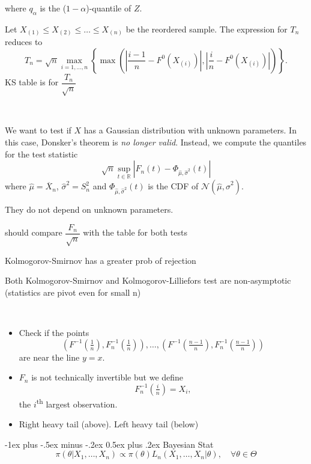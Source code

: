 \documentclass[a4paper, 10pt,landscape]{article}
\makeatletter
\renewcommand{\section}{\@startsection{section}{1}{0mm}%
                                {-1ex plus -.5ex minus -.2ex}%
                                {0.5ex plus .2ex}%
                                {\normalfont\large\bfseries}}
\makeatother
\begin{document}
\begin{multicols*}{4}
\begin{description}
\begin{description}
				where $q_\alpha$ is the ($1-\alpha$)-quantile of $Z$.
				\item Let $X_{(1)}\leq X_{(2)}\leq\dots\leq X_{(n)}$ be the reordered sample. The expression for $T_n$ reduces to
				$$T_n=\sqrt{n}\max\limits_{i=1,\dots,n}\left\{\max\left(\left|\dfrac{i-1}{n}-F^0\left(X_{(i)}\right)\right|,\left|\dfrac{i}{n}-F^0\left(X_{(i)}\right)\right|\right)\right\}.$$
				KS table is for $\dfrac{T_n}{\sqrt{n}}$
			\end{description}	
		\item[Kolmogorov-Lilliefors Test]~
			\begin{description}		
				\item We want to test if $X$ has a Gaussian distribution with unknown parameters. In this case, Donsker's theorem is {\it no longer valid}. Instead, we compute the quantiles for the test statistic
				$$\sqrt{n}\sup\limits_{t\in\mathbb{R}}\left|F_n(t)-\Phi_{\hat{\mu},\hat{\sigma}^2}(t)\right|$$
				where $\hat{\mu}=\overline{X}_n$, $\hat{\sigma}^2=S_n^2$ and $\Phi_{\hat{\mu},\hat{\sigma}^2}(t)$ is the CDF of $\mathcal{N}\left(\hat{\mu},\hat{\sigma}^2\right).$
				\item They do not depend on unknown parameters.
				\item should compare $\dfrac{F_n}{\sqrt{n}}$ with the table for both tests
				\item Kolmogorov-Smirnov has a greater prob of rejection
				\item Both Kolmogorov-Smirnov and Kolmogorov-Lilliefors test are non-asymptotic (statistics are pivot even for small n)
			\end{description}
		\item[QQ plot]~
			\begin{itemize}
				\item Check if the points
				$$\left(F^{-1}(\tfrac{1}{n}),F_n^{-1}(\tfrac{1}{n})\right),\dots,\left(F^{-1}(\tfrac{n-1}{n}),F_n^{-1}(\tfrac{n-1}{n})\right)$$
				are near the line $y=x.$
				\item $F_n$ is not technically invertible but we define
				$$F_n^{-1}(\tfrac{i}{n})=X_i,$$
				the $i$\textsuperscript{th} largest observation.
				\item Right heavy tail (above). Left heavy tail (below)
			\end{itemize}		
	\end{description}

\section{Bayesian Stat}
$$\pi\left(\theta|X_1,\dots,X_n\right)\propto\pi(\theta)L_n(X_1,\dots,X_n|\theta),\quad\forall\theta\in\Theta$$


\end{multicols*}
\end{document}
